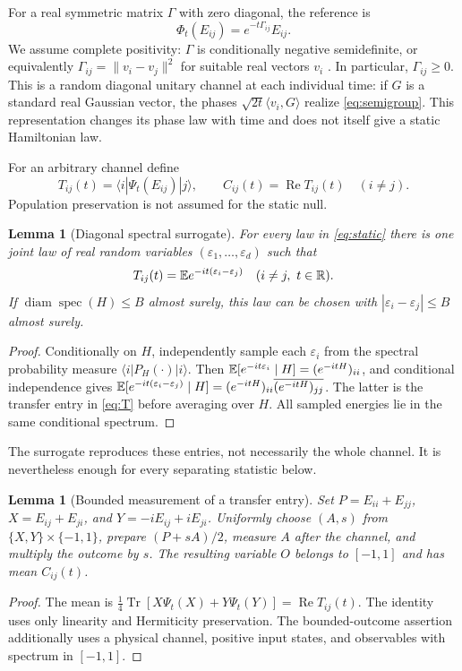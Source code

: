 \documentclass[11pt,a4paper]{article}
\newtheorem{lemma}[theorem]{Lemma}
\theoremstyle{remark}\newtheorem{remark}[theorem]{Remark}
\newcommand{\R}{\mathbb R}\newcommand{\C}{\mathbb C}
\newcommand{\Tr}{\operatorname{Tr}}
\newcommand{\diam}{\operatorname{diam}}
\newcommand{\Rea}{\operatorname{Re}}
\begin{document}
For a real symmetric matrix $\Gamma$ with zero diagonal, the reference is
\begin{equation}\label{eq:semigroup}
 \Phi_t(E_{ij})=e^{-t\Gamma_{ij}}E_{ij}.
\end{equation}
We assume complete positivity: $\Gamma$ is conditionally negative
semidefinite, or equivalently $\Gamma_{ij}=\|v_i-v_j\|^2$ for suitable
real vectors $v_i$ \cite{schoenberg}. In particular, $\Gamma_{ij}\geq0$.
This is a random diagonal unitary channel at each individual time:
if $G$ is a standard real Gaussian vector, the phases
$\sqrt{2t}\langle v_i,G\rangle$ realize \eqref{eq:semigroup}.
This representation changes its phase law with time and does not itself
give a static Hamiltonian law.

For an arbitrary channel define
\begin{equation}\label{eq:T}
 T_{ij}(t)=\langle i|\Psi_t(E_{ij})|j\rangle,\qquad
 C_{ij}(t)=\Rea T_{ij}(t)\quad(i\ne j).
\end{equation}
Population preservation is not assumed for the static null.

\begin{lemma}[Diagonal spectral surrogate]\label{lem:surrogate}
For every law in \eqref{eq:static} there is one joint law of real random
variables $(\varepsilon_1,\ldots,\varepsilon_d)$ such that
\begin{equation}\label{eq:surrogate}
 T_{ij}(t)=\E e^{-it(\varepsilon_i-\varepsilon_j)}
 \quad(i\ne j,\ t\in\R).
\end{equation}
If $\diam\operatorname{spec}(H)\leq B$ almost surely, this law can be
chosen with $|\varepsilon_i-\varepsilon_j|\leq B$ almost surely.
\end{lemma}
\begin{proof}
Conditionally on $H$, independently sample each $\varepsilon_i$ from
the spectral probability measure $\langle i|P_H(\cdot)|i\rangle$.
Then $\mathbb E[e^{-it\varepsilon_i}\mid H]=(e^{-itH})_{ii}$, and conditional
independence gives
$\mathbb E[e^{-it(\varepsilon_i-\varepsilon_j)}\mid H]
=(e^{-itH})_{ii}\overline{(e^{-itH})_{jj}}$.
The latter is the transfer entry in \eqref{eq:T} before averaging over
$H$. All sampled energies lie in the same conditional spectrum.
\end{proof}

The surrogate reproduces these entries, not necessarily the whole
channel. It is nevertheless enough for every separating statistic below.

\begin{lemma}[Bounded measurement of a transfer entry]\label{lem:phase}
Set $P=E_{ii}+E_{jj}$, $X=E_{ij}+E_{ji}$, and
$Y=-iE_{ij}+iE_{ji}$. Uniformly choose $(A,s)$ from
$\{X,Y\}\times\{-1,1\}$, prepare $(P+sA)/2$, measure $A$ after the
channel, and multiply the outcome by $s$. The resulting variable $O$
belongs to $[-1,1]$ and has mean $C_{ij}(t)$.
\end{lemma}
\begin{proof}
The mean is
$\frac14\Tr[X\Psi_t(X)+Y\Psi_t(Y)]=\Rea T_{ij}(t)$.
The identity uses only linearity and Hermiticity preservation.
The bounded-outcome assertion additionally uses a physical channel,
positive input states, and observables with spectrum in $[-1,1]$.
\end{proof}
\end{document}

